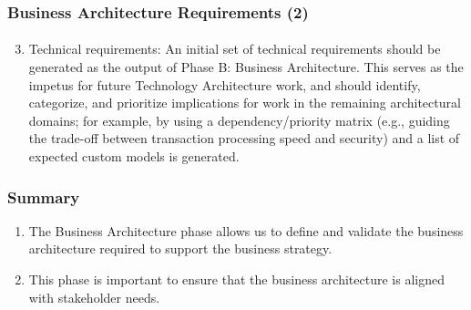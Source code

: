\documentclass[aspectratio=169, table]{beamer}
\begin{document}
\begin{frame}
    \frametitle{Business Architecture Requirements (2)}
     \framesubtitle{\hspace{1cm}}
    \begin{enumerate}
        \setcounter{enumi}{2}
        \item Technical requirements: An initial set of technical requirements should be generated as the output of Phase B: Business Architecture. This serves as the impetus for future Technology Architecture work, and should identify, categorize, and prioritize implications for work in the remaining architectural domains; for example, by using a dependency/priority matrix (e.g., guiding the trade-off between transaction processing speed and security) and a list of expected custom models is generated.

    \end{enumerate}
\end{frame}


\begin{frame}
    \frametitle{Summary}
    \begin{enumerate}
        \item The Business Architecture phase allows us to define and validate the business architecture required to support the business strategy.
        \item This phase is important to ensure that the business architecture is aligned with stakeholder needs.
    \end{enumerate}
\end{frame}
\end{document}
